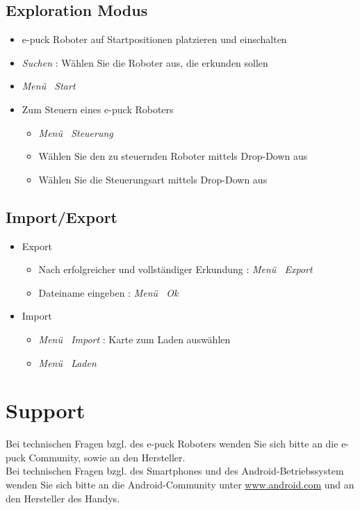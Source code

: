 \documentclass[10pt,a4paper]{article}
\let\oldsection\section
\renewcommand{\section}{\newpage \oldsection}
\begin{document}
	\subsection{Exploration Modus}
		\begin{itemize}
			\item{e-puck Roboter auf Startpositionen platzieren und einschalten}
			\item{\textit{Suchen} : W\"ahlen Sie die Roboter aus, die erkunden sollen}			
			\item{\textit{Men\"u \frq \frq \ Start}}
			\item{Zum Steuern eines e-puck Roboters}
			\begin{itemize}
				\item{\textit{Men\"u \frq \frq \ Steuerung}}
				\item{W\"ahlen Sie den zu steuernden Roboter mittels Drop-Down aus}
				\item{W\"ahlen Sie die Steuerungsart mittels Drop-Down aus}
			\end{itemize}
		\end{itemize}
	\subsection{Import/Export}
		\begin{itemize}
			\item{Export}
				\begin{itemize}
					\item{Nach erfolgreicher und vollst\"andiger Erkundung : \textit{Men\"u \frq \frq \ Export}}
					\item{Dateiname eingeben : \textit{Men\"u \frq \frq \ Ok}}
				\end{itemize}
			\item{Import}			
				\begin{itemize}
					\item{\textit{Men\"u \frq \frq \ Import} : Karte zum Laden ausw\"ahlen}
					\item{\textit{Men\"u \frq \frq \ Laden}}
				\end{itemize}
		\end{itemize}
\section{Support}
	Bei technischen Fragen bzgl. des e-puck Roboters wenden Sie sich bitte an die e-puck Community, sowie an den Hersteller. \\
	Bei technischen Fragen bzgl. des Smartphones und des Android-Betriebssystem wenden Sie sich bitte an die Android-Community unter \url{www.android.com} 
	und an den Hersteller des Handys.
\end{document}
